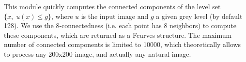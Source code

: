 This module quickly computes the connected 
components of the 
level set $\{x, \; u(x) \leq g\}$, 
where $u$ is the input image and $g$ a given grey level 
(by default 128). 
We use the 8-connectedness (i.e. each point has 8 neighbors) to compute these
components, which are returned as a Fcurves structure.
The maximum number of connected 
components is limited to 10000, which theoretically allows to 
process any 200x200 image, and actually any natural image.